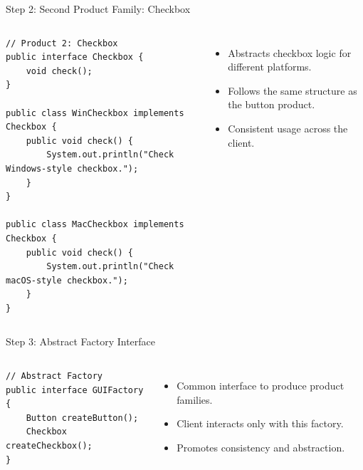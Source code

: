 \documentclass[aspectratio=169, table]{beamer}
\begin{document}
\begin{frame}[fragile]{Step 2: Second Product Family: Checkbox}
\vspace{20pt}
\begin{columns}[T]
\begin{lstlisting}[style=JavaStyle]
// Product 2: Checkbox
public interface Checkbox {
	void check();
}

public class WinCheckbox implements Checkbox {
	public void check() {
		System.out.println("Check Windows-style checkbox.");
	}
}

public class MacCheckbox implements Checkbox {
	public void check() {
		System.out.println("Check macOS-style checkbox.");
	}
}
\end{lstlisting}

\begin{itemize}
\item Abstracts checkbox logic for different platforms.
\item Follows the same structure as the button product.
\item Consistent usage across the client.
\end{itemize}
\end{columns}
\end{frame}

\begin{frame}[fragile]{Step 3: Abstract Factory Interface}
\vspace{5pt}
\begin{columns}[T]
\begin{lstlisting}[style=JavaStyle]
// Abstract Factory
public interface GUIFactory {
	Button createButton();
	Checkbox createCheckbox();
}
\end{lstlisting}

\begin{itemize}
\item Common interface to produce product families.
\item Client interacts only with this factory.
\item Promotes consistency and abstraction.
\end{itemize}
\end{columns}
\end{frame}
\end{document}
